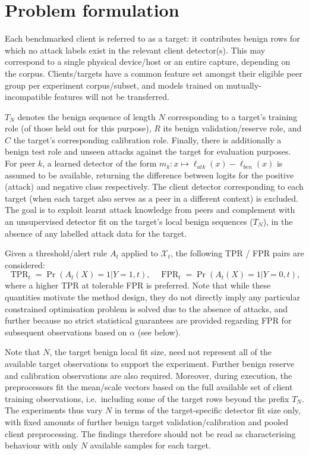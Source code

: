 \section{Problem formulation} 
\label{sec:problem} 
Each benchmarked client is referred to as a target: it contributes benign rows for which no attack labels exist in the relevant client detector(s). This may correspond to a single physical device/host or an entire capture, depending on the corpus. Clients/targets have a common feature set amongst their eligible peer group per experiment corpus/subset, and models trained on mutually-incompatible features will not be transferred.

$T_N$ denotes the benign sequence of length $N$ corresponding to a target's training role (of those held out for this purpose), $R$ its benign validation/reserve role, and $C$ the target's corresponding calibration role. Finally, there is additionally a benign test role and unseen attacks against the target for evaluation purposes. For peer $k$, a learned detector of the form $m_k: x \mapsto \ell_{atk}(x)-\ell_{ben}(x)$ is assumed to be available, returning the difference between logits for the positive (attack) and negative class respectively. The client detector corresponding to each target (when each target also serves as a peer in a different context) is excluded. The goal is to exploit learnt attack knowledge from peers and complement with an unsupervised detector fit on the target's local benign sequences ($T_N$), in the absence of any labelled attack data for the target.

Given a threshold/alert rule $A_t$ applied to $\mathcal{X}_t$, the following TPR / FPR pairs are considered:
\begin{equation} 
\operatorname{TPR}_t=\Pr(A_t(X) = 1 | Y=1, t),\quad
\operatorname{FPR}_t=\Pr(A_t(X) = 1 | Y=0, t),
\label{eq:objective} 
\end{equation} 
where a higher TPR at tolerable FPR is preferred. Note that while these quantities motivate the method design, they do not directly imply any particular constrained optimisation problem is solved due to the absence of attacks, and further because no strict statistical guarantees are provided regarding FPR for subsequent observations based on $\alpha$ (see below).



Note that $N$, the target benign local fit size, need not represent all of the available target observations to support the experiment. Further benign reserve and calibration observations are also required. Moreover, during execution, the preprocessors fit the mean/scale vectors based on the full available set of client training observations, i.e.\ including some of the target rows beyond the prefix $T_N$. The experiments thus vary $N$ in terms of the target-specific detector fit size only, with fixed amounts of further benign target validation/calibration and pooled client preprocessing. The findings therefore should not be read as characterising behaviour with only $N$ available samples for each target.

